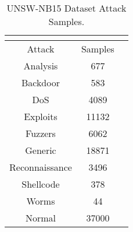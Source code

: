 \begin{longtable}{@{}ccc@{}}
\caption{UNSW-NB15 Dataset Attack Samples.} \\
\label{unswattacks} \\
\toprule
Attack & Samples \\
\midrule
Analysis & 677 \\
Backdoor & 583 \\
DoS & 4089 \\
Exploits & 11132  \\
Fuzzers & 6062 \\
Generic & 18871\\
Reconnaissance & 3496 \\
Shellcode & 378\\
Worms & 44 \\
Normal & 37000 \\
\bottomrule
\end{longtable}
